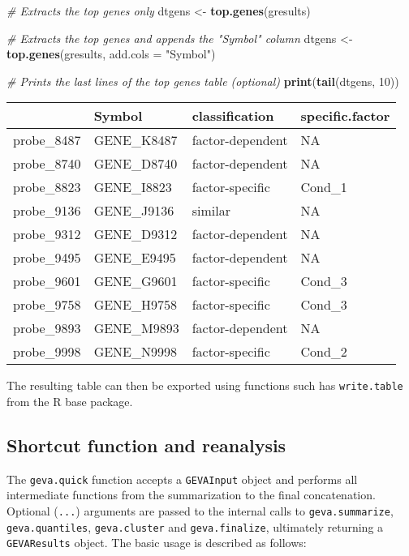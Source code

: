 \documentclass[
  12pt,
]{article}
\newenvironment{Shaded}{\begin{snugshade}}{\end{snugshade}}
\newcommand{\CommentTok}[1]{\textcolor[rgb]{0.56,0.35,0.01}{\textit{#1}}}
\newcommand{\DataTypeTok}[1]{\textcolor[rgb]{0.13,0.29,0.53}{#1}}
\newcommand{\DecValTok}[1]{\textcolor[rgb]{0.00,0.00,0.81}{#1}}
\newcommand{\KeywordTok}[1]{\textcolor[rgb]{0.13,0.29,0.53}{\textbf{#1}}}
\newcommand{\NormalTok}[1]{#1}
\newcommand{\StringTok}[1]{\textcolor[rgb]{0.31,0.60,0.02}{#1}}
\begin{document}
\begin{Shaded}
\begin{Highlighting}[]
\CommentTok{# Extracts the top genes only}
\NormalTok{dtgens <-}\StringTok{ }\KeywordTok{top.genes}\NormalTok{(gresults)}

\CommentTok{# Extracts the top genes and appends the "Symbol" column}
\NormalTok{dtgens <-}\StringTok{ }\KeywordTok{top.genes}\NormalTok{(gresults, }\DataTypeTok{add.cols =} \StringTok{"Symbol"}\NormalTok{)}

\CommentTok{# Prints the last lines of the top genes table (optional)}
\KeywordTok{print}\NormalTok{(}\KeywordTok{tail}\NormalTok{(dtgens, }\DecValTok{10}\NormalTok{))}
\end{Highlighting}
\end{Shaded}

\begin{longtable}[]{@{}llll@{}}
\toprule
& Symbol & classification & specific.factor\tabularnewline
\midrule
\endhead
probe\_8487 & GENE\_K8487 & factor-dependent & NA\tabularnewline
probe\_8740 & GENE\_D8740 & factor-dependent & NA\tabularnewline
probe\_8823 & GENE\_I8823 & factor-specific & Cond\_1\tabularnewline
probe\_9136 & GENE\_J9136 & similar & NA\tabularnewline
probe\_9312 & GENE\_D9312 & factor-dependent & NA\tabularnewline
probe\_9495 & GENE\_E9495 & factor-dependent & NA\tabularnewline
probe\_9601 & GENE\_G9601 & factor-specific & Cond\_3\tabularnewline
probe\_9758 & GENE\_H9758 & factor-specific & Cond\_3\tabularnewline
probe\_9893 & GENE\_M9893 & factor-dependent & NA\tabularnewline
probe\_9998 & GENE\_N9998 & factor-specific & Cond\_2\tabularnewline
\bottomrule
\end{longtable}

The resulting table can then be exported using functions such has
\texttt{write.table} from the R base package.

\hypertarget{shortcut-function-and-reanalysis}{%
\subsection{Shortcut function and
reanalysis}\label{shortcut-function-and-reanalysis}}

The \texttt{geva.quick} function accepts a \texttt{GEVAInput} object and
performs all intermediate functions from the summarization to the final
concatenation. Optional (\texttt{...}) arguments are passed to the
internal calls to \texttt{geva.summarize}, \texttt{geva.quantiles},
\texttt{geva.cluster} and \texttt{geva.finalize}, ultimately returning a
\texttt{GEVAResults} object. The basic usage is described as follows:
\end{document}
